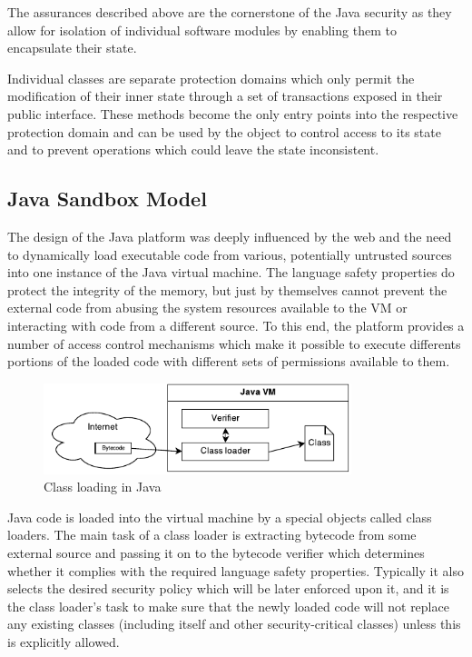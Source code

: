 \documentclass[a4paper,12pt,twoside,openright]{report}
\begin{document}
The assurances described above are the cornerstone of the Java security as they allow for isolation of individual software modules by enabling them to encapsulate their state. 

Individual classes are separate protection domains which only permit the modification of their inner state through a set of transactions exposed in their public interface. These methods become the only entry points into the respective protection domain and can be used by the object to control access to its state and to prevent operations which could leave the state inconsistent.


\subsection{Java Sandbox Model}

The design of the Java platform was deeply influenced by the web and the need to dynamically load executable code from various, potentially untrusted sources into one instance of the Java virtual machine. The language safety properties do protect the integrity of the memory, but just by themselves cannot prevent the external code from abusing the system resources available to the VM or interacting with code from a different source. To this end, the platform provides a number of access control mechanisms which make it possible to execute differents portions of the loaded code with different sets of permissions available to them. 

\begin{figure}
	\centering
	\includegraphics[width=0.8\textwidth]{dia_java_classload.pdf}
	\caption{Class loading in Java}
\end{figure}

Java code is loaded into the virtual machine by a special objects called class loaders. The main task of a class loader is extracting bytecode from some external source and passing it on to the bytecode verifier which determines whether it complies with the required language safety properties. Typically it also selects the desired security policy which will be later enforced upon it, and it is the class loader's task to make sure that the newly loaded code will not replace any existing classes (including itself and other security-critical classes) unless this is explicitly allowed. 
\end{document}
